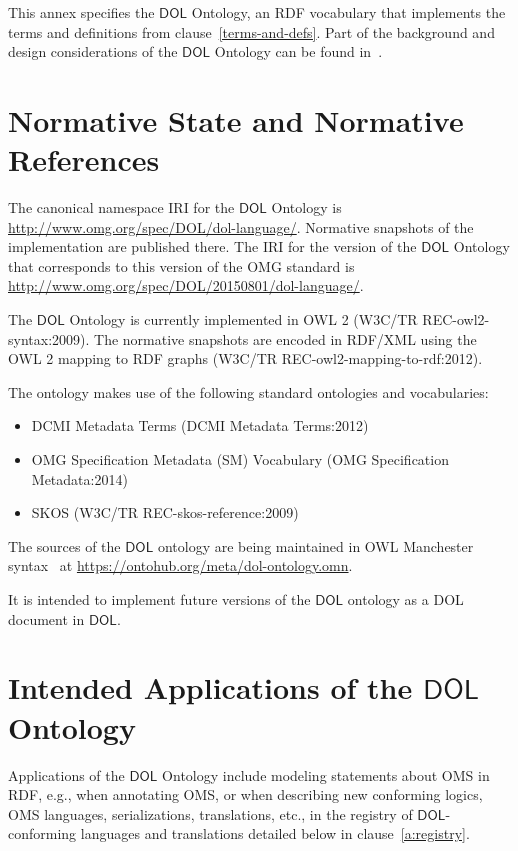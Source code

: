 \documentclass[10pt,fleqn,final]{scrreprt}
\newcommand*{\termref}[1]{\index{#1}#1\xspace}
\newcommand*{\DOL}{\ensuremath{\mathsf{DOL}}\xspace}
\newcommand{\clauserefname}{clause}
\newcommand{\cref}[1]{\clauserefname~\ref{#1}}
\newcommand{\nisref}[1]{#1}
\newenvironment{definitions}[0]{\medskip }{}
\begin{document}
\begin{definitions}
This annex specifies the \DOL Ontology, an RDF vocabulary that implements the terms and definitions from \cref{terms-and-defs}.
Part of the background and design considerations of the \DOL Ontology can be found in~\cite{LMK:LoLaModularOntologyLogLangTrans12}.

\section{Normative State and Normative References}\label{a:dol-onto-norm}


The canonical namespace IRI for the \DOL Ontology is \url{http://www.omg.org/spec/DOL/dol-language/}.
Normative snapshots of the implementation are published there.
The IRI for the version of the \DOL Ontology that corresponds to this version of the OMG standard is \url{http://www.omg.org/spec/DOL/20150801/dol-language/}.

The \DOL Ontology is currently implemented in OWL 2 (\nisref{W3C/TR REC-owl2-syntax:2009}).
The normative snapshots are encoded in RDF/XML using the OWL 2 mapping to RDF graphs (\nisref{W3C/TR REC-owl2-mapping-to-rdf:2012}).

The ontology makes use of the following standard ontologies and vocabularies:
\begin{itemize}
\item DCMI Metadata Terms (\nisref{DCMI Metadata Terms:2012})
\item OMG Specification Metadata (SM) Vocabulary (\nisref{OMG Specification Metadata:2014})
\item SKOS (\nisref{W3C/TR REC-skos-reference:2009})
\end{itemize}

The sources of the \DOL ontology are being maintained in OWL Manchester syntax~\cite{W3C:NOTE-owl2-manchester-syntax-20091027} at \url{https://ontohub.org/meta/dol-ontology.omn}.

It is intended to implement future versions of the \DOL ontology as a DOL document in \DOL.

\section{Intended Applications of the \DOL Ontology}\label{a:dol-onto-app}

Applications of the \DOL Ontology include modeling statements about OMS in RDF, e.g., when annotating OMS, or when describing new conforming logics, OMS languages, serializations, translations, etc., in the \termref{registry} of \DOL-conforming languages and translations detailed below in clause~\ref{a:registry}.


\end{definitions}
\end{document}
